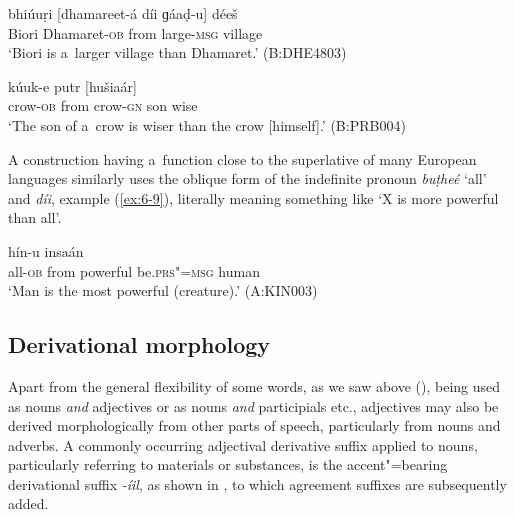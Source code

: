 \begin{exe}
\ex
\label{ex:6-7}
\gll bhiúuṛi [dhamareet-á díi ɡáaḍ-u] déeš \\
Biori Dhamaret-\textsc{ob} from large-\textsc{msg} village \\
\glt `Biori is a~larger village than Dhamaret.' (B:DHE4803)

\ex
\label{ex:6-8}
 kúuk-e putr [hušiaár] \\
crow-\textsc{ob} from crow-\textsc{gn} son wise  \\
\glt `The son of a~crow is wiser than the crow [himself].' (B:PRB004)
\end{exe}

A construction having a~function close to the superlative of many European languages similarly uses the oblique form of the indefinite pronoun \textit{buṭheé} `all' and \textit{díi}, example (\ref{ex:6-9}), literally meaning something like `X is more powerful than all'.

\begin{exe}
\ex
\label{ex:6-9}
 hín-u insaán \\
all-\textsc{ob} from powerful be.\textsc{prs"=msg} human \\
\glt `Man is the most powerful (creature).' (A:KIN003)
\end{exe}

\subsection{Derivational morphology}
\label{subsec:6-3-4}

Apart from the general flexibility of some words, as we saw above (), being used as nouns \textit{and} adjectives or as nouns \textit{and} participials etc., adjectives may also be derived morphologically from other parts of speech, particularly from nouns and adverbs. A commonly occurring adjectival derivative suffix applied to nouns, particularly referring to materials or substances, is the accent"=bearing derivational suffix \textit{-íil}, as shown in , to which agreement suffixes are subsequently added.



